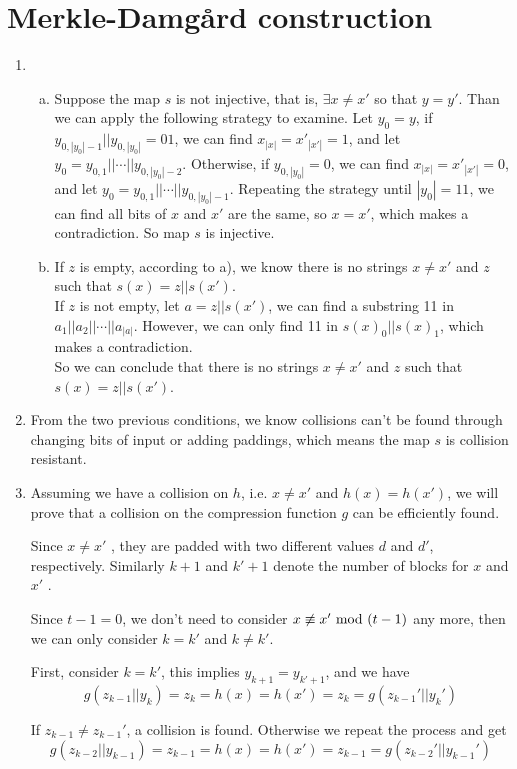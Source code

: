 \documentclass{article}
\renewcommand{\mod}{{\rm\ mod\ }}
\begin{document}
\section{Merkle-Damgård construction}
\begin{enumerate}
\item
\begin{enumerate}[a)]
\item
Suppose the map $s$ is not injective, that is, $\exists x\neq x'$ so that $y=y'$. Than we can apply the following strategy to examine. Let $y_0=y$, if $y_{0,|y_0|-1}||y_{0,|y_0|}=01$, we can find $x_{|x|}=x'_{|x'|}=1$, and let $y_0=y_{0,1}||\cdots||y_{0,|y_0|-2}$. Otherwise, if $y_{0,|y_0|}=0$, we can find $x_{|x|}=x'_{|x'|}=0$, and let $y_0=y_{0,1}||\cdots||y_{0,|y_0|-1}$. Repeating the strategy until $|y_0|=11$, we can find all bits of $x$ and $x'$ are the same, so $x=x'$, which makes a contradiction. So map $s$ is injective.
\item
If $z$ is empty, according to a), we know there is no strings $x\neq x'$ and $z$ such that $s(x) = z||s(x')$.\\
If $z$ is not empty, let $a=z||s(x')$, we can find a substring 11 in $a_1||a_2||\cdots||a_{|a|}$. However, we can only find 11 in $s(x)_0||s(x)_1$, which makes a contradiction.\\
So we can conclude that there is no strings $x\neq x'$ and $z$ such that $s(x) = z||s(x')$.
\end{enumerate}
\item
From the two previous conditions, we know collisions can't be found through changing bits of input or adding paddings, which means the map $s$ is collision resistant.
\item
Assuming we have a collision on $h$, i.e. $x\neq x'$ and $h(x)=h(x')$, we will prove that a collision on the compression function $g$ can be efficiently found.

Since $x\neq x'$ , they are padded with two different values $d$ and $d'$, respectively. Similarly $k + 1$ and $k' + 1$ denote the number of blocks for $x$ and $x'$ .

Since $t-1=0$, we don't need to consider $x\not\equiv x'\mod(t-1)$ any more, then we can only consider $k=k'$ and $k\neq k'$.

First, consider $k=k'$, this implies $y_{k+1}=y_{k'+1}$, and we have $$g(z_{k-1}||y_k)=z_{k}=h(x)=h(x')=z_k=g(z_{k-1}'||y_k')$$

If $z_{k-1}\neq z_{k-1}'$, a collision is found. Otherwise we repeat the
process and get $$g(z_{k-2}||y_{k-1})=z_{k-1}=h(x)=h(x')=z_{k-1}=g(z_{k-2}'||y_{k-1}')$$


\end{enumerate}
\end{document}
